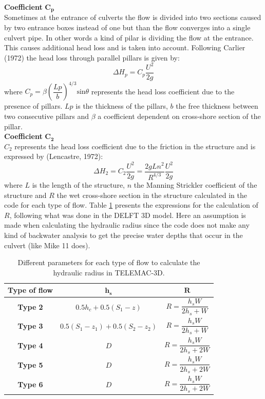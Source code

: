 \textbf{Coefficient} $\mathbf{C_p}$\\
Sometimes at the entrance of culverts the flow is divided into two sections 
caused by two entrance boxes instead of one but than the flow converges into 
a single culvert pipe. In other words a kind of pilar is dividing the flow at the entrance. 
This causes additional head loss and is taken into account. 
Following Carlier (1972) the head loss through parallel pillars is given by:
\begin{equation}
\Delta H_p = C_p \dfrac{U^2}{2g}
\end{equation}
where $C_p=\beta \left(\dfrac{Lp}{b}\right)^{4/3} \text{sin} \theta$  represents the head 
loss coefficient due to the presence of pillars. $Lp$ is the thickness of the pillars, $b$ 
the free thickness between two consecutive pillars and $\beta$ 
a coefficient dependent on cross-shore section of the pillar.\\

\textbf{Coefficient} $\mathbf{C_2}$\\
$C_2$ represents the head loss coefficient due to the friction in the structure 
and is expressed by (Lencastre, 1972):
\begin{equation}
\Delta H_2 = C_2  \dfrac{U^2}{2g} = \dfrac{2gLn^2}{R^{4/3}}\dfrac{U^2}{2g}
\end{equation}
where $L$ is the length of the structure, $n$ the Manning Strickler coefficient 
of the structure and $R$ the wet cross-shore section in the structure calculated 
in the code for each type of flow. 
Table \ref{tab:culvert_tab3} presents the expressions for the calculation of $R$, 
following what was done in the DELFT 3D model. 
Here an assumption is made when calculating the hydraulic radius since the 
code does not make any kind of backwater analysis to get the 
precise water depths that occur in the culvert (like Mike 11 does).
\begin{table}[H]
\caption{Different parameters for each type of flow to calculate the hydraulic radius in TELEMAC-3D.}
\label{tab:culvert_tab3}
\begin{center}\begin{tabular}{|c|c|c|}
\hline
\textbf{Type of flow} & $\mathbf{h_s}$ & $\mathbf{R}$ \\
\hline
\textbf{Type 2} & $0.5 h_c + 0.5(S_1-z)$    & $R = \dfrac{h_s W}{2 h_s+W}$ \\
\hline
\textbf{Type 3} & $0.5 (S_1 - z_1) + 0.5(S_2-z_2)$    & $R = \dfrac{h_s W}{2 h_s+W}$ \\
\hline
\textbf{Type 4} & $D$    & $R = \dfrac{h_s W}{2 h_s+2W}$ \\
\hline
\textbf{Type 5} & $D$    & $R = \dfrac{h_s W}{2 h_s+2W}$ \\
\hline
\textbf{Type 6} & $D$    & $R = \dfrac{h_s W}{2 h_s+2W}$ \\
\hline
\end{tabular}\end{center}
\end{table}


